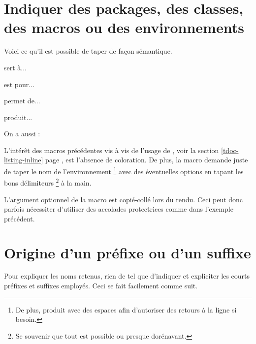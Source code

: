 

\section{Indiquer des packages, des classes, des macros ou des environnements}

Voici ce qu'il est possible de taper de façon sémantique.


\begin{tdoclatex}[sbs]
 sert à...

 est pour...

 permet de...

 produit...

On a aussi :

\end{tdoclatex}


\begin{tdocrem}
    L'intérêt des macros précédentes vis à vis de l'usage de , voir la section \ref{tdoc-listing-inline} page \pageref{tdoc-listing-inline}, est l'absence de coloration.
    De plus, la macro  demande juste de taper le nom de l'environnement
    \footnote{
        De plus,  produit  avec des espaces afin d'autoriser des retours à la ligne si besoin.
    }
    avec des éventuelles options en tapant les bons délimiteurs
    \footnote{
        Se souvenir que tout est possible ou presque dorénavant.
    }
    à la main.
\end{tdocrem}


\begin{tdocwarn}
    L'argument optionnel de la macro  est copié-collé lors du rendu. Ceci peut donc parfois nécessiter d'utiliser des accolades protectrices comme dans l'exemple précédent.
\end{tdocwarn}




\section{Origine d'un préfixe ou d'un suffixe}

Pour expliquer les noms retenus, rien de tel que d'indiquer et expliciter les courts préfixes et suffixes employés. Ceci se fait facilement comme suit.


